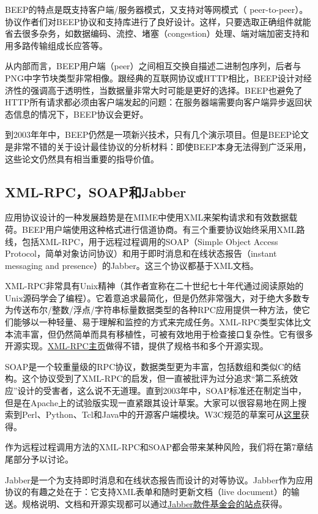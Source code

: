 \documentclass[12pt,oneside]{book}
\begin{document}
BEEP的特点是既支持客户端/服务器模式，又支持对等网模式（ peer-to-peer）。协议作者们对BEEP协议和支持库进行了良好设计。这样，只要选取正确组件就能省去很多杂务，如数据编码、流控、堵塞（congestion）处理、端对端加密支持和用多路传输组成长应答等。

从内部而言，BEEP用户端（peer）之间相互交换自描述二进制包序列，后者与PNG中字节块类型非常相像。跟经典的互联网协议或HTTP相比，BEEP设计对经济性的强调高于透明性，当数据量非常大时可能是更好的选择。BEEP也避免了HTTP所有请求都必须由客户端发起的问题：在服务器端需要向客户端异步返回状态信息的情况下，BEEP协议会更好。

到2003年年中，BEEP仍然是一项新兴技术，只有几个演示项目。但是BEEP论文是非常不错的关于设计最佳协议的分析材料：即使BEEP本身无法得到广泛采用，这些论文仍然具有相当重要的指导价值。

\subsection{XML-RPC，SOAP和Jabber}
应用协议设计的一种发展趋势是在MIME中使用XML来架构请求和有效数据载荷。BEEP用户端使用这种格式进行信道协商。有三个重要协议始终采用XML路线，包括XML-RPC，用于远程过程调用的SOAP（Simple Object Access Protocol，简单对象访问协议）和用于即时消息和在线状态报告（instant messaging and presence）的Jabber。这三个协议都基于XML文档。

XML-RPC非常具有Unix精神（其作者宣称在二十世纪七十年代通过阅读原始的Unix源码学会了编程）。它着意追求最简化，但是仍然非常强大，对于绝大多数专为传送布尔/整数/浮点/字符串标量数据类型的各种RPC应用提供一种方法，使它们能够以一种轻量、易于理解和监控的方式来完成任务。XML-RPC类型实体比文本流丰富，但仍然简单而具有移植性，可被有效地用于检查接口复杂性。它有很多开源实现。\href{http://www.xmlrpc.com/}{XML-RPC主页}做得不错，提供了规格书和多个开源实现。

SOAP是一个较重量级的RPC协议，数据类型更为丰富，包括数组和类似C的结构。这个协议受到了XML-RPC的启发，但一直被批评为过分追求“第二系统效应”设计的受害者，这么说不无道理。直到2003年中，SOAP标准还在制定当中，但是在Apache上的试验版实现一直紧跟其设计草案。大家可以很容易地在网上搜索到Perl、Python、Tcl和Java中的开源客户端模块。W3C规范的草案可从\href{http://www.w3.org/TR/SOAP/}{这里}获得。

作为远程过程调用方法的XML-RPC和SOAP都会带来某种风险，我们将在第7章结尾部分予以讨论。

Jabber是一个为支持即时消息和在线状态报告而设计的对等协议。Jabber作为应用协议的有趣之处在于：它支持XML表单和随时更新文档（live document）的输送。规格说明、文档和开源实现都可以通过\href{http://www.jabber.org/about/overview.html}{Jabber款件基金会的站点}获得。
\end{document}
